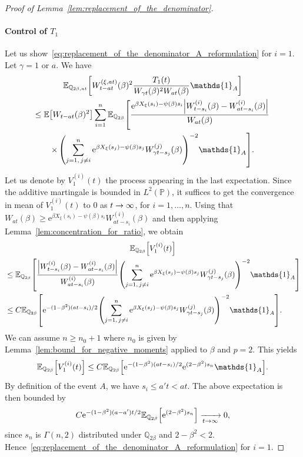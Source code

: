 \documentclass[AHL,Unicode,longabstracts,published]{cedram}
\newcommand{\e}{\mathrm{e}}
\newcommand{\E}{\mathbb{E}}
\renewcommand{\P}{\mathbb{P}}
\newcommand{\Q}{\mathbb{Q}}
\newcommand\1{\mathds{1}}
\let\originalleft\left
\let\originalright\right
\renewcommand{\left}{\mathopen{}\mathclose\bgroup\originalleft}
\renewcommand{\right}{\aftergroup\egroup\originalright}
\renewcommand*{\to}{\mathchoice{\longrightarrow}{\rightarrow}{\rightarrow}{\rightarrow}}
\begin{document}
\begin{proof}[Proof of Lemma~\ref{lem:replacement_of_the_denominator}]
\paragraph*{Control of $T_1$} Let us show~\eqref{eq:replacement_of_the_denominator_A_reformulation} for $i = 1$. Let $\gamma = 1 \text{ or } a$. We have
\begin{multline*}
\E_{\Q_{2\beta, at}} \left[W_{t - at}^{(\xi, at)}(\beta)^2 \frac{T_1(t)}{W_{\gamma t}(\beta)^2 W_{at}(\beta)} \1_A \right]  \\
\leq \E \left[W_{t - at}(\beta)^2 \right]
\sum_{i = 1}^n \E_{\Q_{2\beta}} \left[\frac{\e^{\beta X_\xi(s_i) - \psi(\beta)s_i} \left|W_{t - s_i}^{(i)}(\beta) - W_{at - s_i}^{(i)}(\beta)\right|}{W_{at}(\beta)}\right.\\
\times\left. \left(\sum_{j = 1,\, j \neq i}^n \e^{\beta X_\xi(s_j) - \psi(\beta)s_j} W_{\gamma t - s_j}^{(j)}(\beta) \right)^{-2} \1_A \right].
\end{multline*}
Let us denote by $V_1^{(i)}(t)$ the process appearing in the last expectation. Since the additive martingale is bounded in $L^2(\P)$, it suffices to get the convergence in mean of $V_1^{(i)}(t)$ to $0$ as $t \to \infty$, for $i = 1, \dots, n$. Using that $W_{at}(\beta) \geq \e^{\beta X_\xi(s_i) - \psi(\beta)s_i} W_{at - s_i}^{(i)}(\beta)$ and then applying Lemma~\ref{lem:concentration_for_ratio}, we obtain
\begin{multline*}
\E_{\Q_{2 \beta}} \left[V_1^{(i)}(t) \right]  \\
\begin{aligned}
& \leq \E_{\Q_{2 \beta}} \left[\frac{\left|W_{t - s_i}^{(i)}(\beta) - W_{at - s_i}^{(i)}(\beta)\right|}{W_{at - s_i}^{(i)}(\beta)} \left(\sum_{j = 1,\, j \neq i}^n \e^{\beta X_\xi(s_j) - \psi(\beta)s_j} W_{\gamma t - s_j}^{(j)}(\beta) \right)^{-2} \1_A \right]  \\
& \leq C \E_{\Q_{2 \beta}} \left[\e^{-(1-\beta^2)(at-s_i)/2} \left(\sum_{j = 1,\, j \neq i}^n \e^{\beta X_\xi(s_j) - \psi(\beta)s_j} W_{\gamma t - s_j}^{(j)}(\beta) \right)^{-2} \1_A \right]. 
\end{aligned}
\end{multline*}
We can assume $n \geq n_0+1$ where $n_0$ is given by Lemma~\ref{lem:bound_for_negative_moments} applied to $\beta$ and $p = 2$. This yields
\begin{equation*}
\E_{\Q_{2 \beta}} \left[V_1^{(i)}(t) \right] \leq C \E_{\Q_{2 \beta}} \left[\e^{-(1-\beta^2)(at-s_i)/2} \e^{(2 - \beta^2) s_n} \1_A \right].
\end{equation*}
By definition of the event $A$, we have $s_i \leq a't < at$. The above expectation is then bounded by
\begin{equation*}
C \e^{-(1-\beta^2)(a-a')t/2} \E_{\Q_{2 \beta}} \left[\e^{(2 - \beta^2) s_n} \right] \xrightarrow[t \to \infty]{} 0,
\end{equation*}
since $s_n$ is $\Gamma(n, 2)$ distributed under $\Q_{2\beta}$ and $2-\beta^2 < 2$. Hence~\eqref{eq:replacement_of_the_denominator_A_reformulation} for $i = 1$.


\end{proof}
\end{document}
